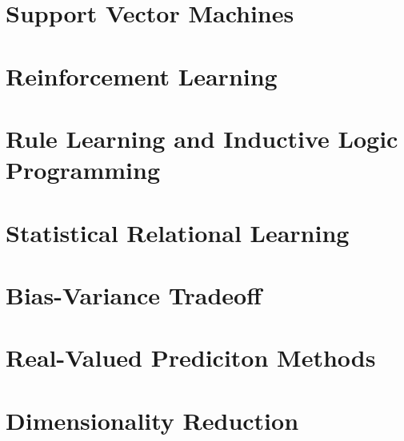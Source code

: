 \documentclass{article}
\begin{document}
	\section{Support Vector Machines}
		\clearpage

	\section{Reinforcement Learning}
		\clearpage
	
	\section{Rule Learning and Inductive Logic Programming}
		\clearpage	

	\section{Statistical Relational Learning}
		\clearpage

	\section{Bias-Variance Tradeoff}
		\clearpage

	\section{Real-Valued Prediciton Methods}
		\clearpage

	\section{Dimensionality Reduction}
		\clearpage

	\appendix


	
\end{document}
